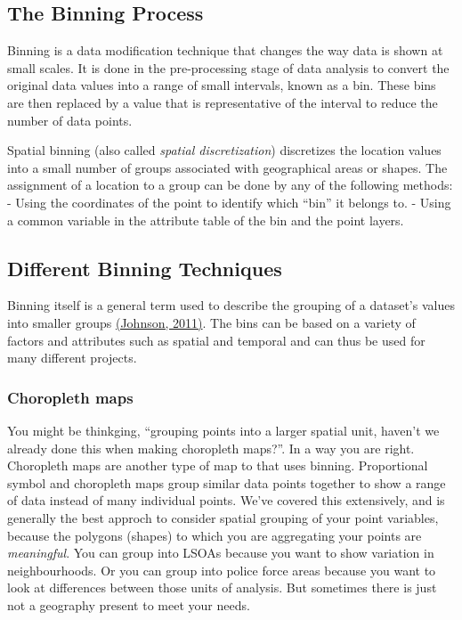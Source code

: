 \documentclass[]{book}
\begin{document}
\hypertarget{the-binning-process}{%
\subsection{The Binning Process}\label{the-binning-process}}

Binning is a data modification technique that changes the way data is shown at small scales. It is done in the pre-processing stage of data analysis to convert the original data values into a range of small intervals, known as a bin. These bins are then replaced by a value that is representative of the interval to reduce the number of data points.

Spatial binning (also called \emph{spatial discretization}) discretizes the location values into a small number of groups associated with geographical areas or shapes. The assignment of a location to a group can be done by any of the following methods:
- Using the coordinates of the point to identify which ``bin'' it belongs to.
- Using a common variable in the attribute table of the bin and the point layers.

\hypertarget{different-binning-techniques}{%
\subsection{Different Binning Techniques}\label{different-binning-techniques}}

Binning itself is a general term used to describe the grouping of a dataset's values into smaller groups \href{http://indiemaps.com/blog/2011/10/hexbins/}{(Johnson, 2011)}. The bins can be based on a variety of factors and attributes such as spatial and temporal and can thus be used for many different projects.

\hypertarget{choropleth-maps}{%
\subsubsection{Choropleth maps}\label{choropleth-maps}}

You might be thinkging, ``grouping points into a larger spatial unit, haven't we already done this when making choropleth maps?''. In a way you are right. Choropleth maps are another type of map to that uses binning. Proportional symbol and choropleth maps group similar data points together to show a range of data instead of many individual points. We've covered this extensively, and is generally the best approch to consider spatial grouping of your point variables, because the polygons (shapes) to which you are aggregating your points are \emph{meaningful}. You can group into LSOAs because you want to show variation in neighbourhoods. Or you can group into police force areas because you want to look at differences between those units of analysis. But sometimes there is just not a geography present to meet your needs.
\end{document}
